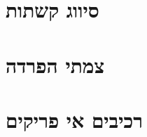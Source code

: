\documentclass[]{article}
\def\insert#1{}
\begin{document}
\def\lecnum{3}
\def\topcis{
סיווג קשתות, צמתי הפרדה, רכיבים אי פריקים
}

\section*{סיווג קשתות}
\insert{edges}
\section*{צמתי הפרדה}
\insert{cut-vertex}
\section*{רכיבים אי פריקים}
\insert{block}
\end{document}
